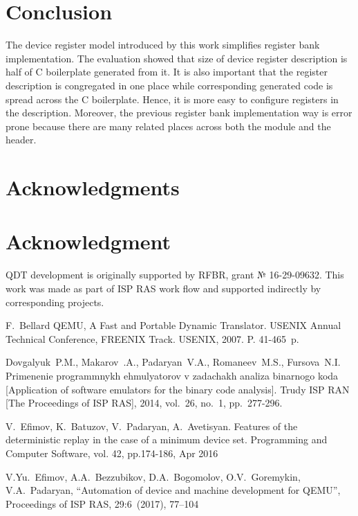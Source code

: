 \documentclass[conference,compsoc,a4paper]{IEEEtran}
\begin{document}
\section{Conclusion}

The device register model introduced by this work simplifies register
bank implementation.
The evaluation showed that size of device register description is half of
C boilerplate generated from it.
It is also important that the register description is congregated in one
place while corresponding generated code is spread across the C boilerplate.
Hence, it is more easy to configure registers in the description.
Moreover, the previous register bank implementation way is error prone
because there are many related places across both the module and the header.


\ifCLASSOPTIONcompsoc
  \section*{Acknowledgments}
\else
  \section*{Acknowledgment}
\fi

QDT development is originally supported by RFBR, grant № 16-29-09632.
This work was made as part of ISP RAS work flow and supported indirectly
by corresponding projects.

\begin{thebibliography}{1}

F.~Bellard QEMU, A Fast and Portable Dynamic Translator. USENIX Annual
Technical Conference, FREENIX Track. USENIX, 2007. P. 41-465~p.

Dovgalyuk~P.M., Makarov~.A., Padaryan~V.A., Romaneev~M.S.,
Fursova~N.I. Primenenie programmnykh ehmulyatorov v zadachakh
analiza binarnogo koda [Application of software emulators for
the binary code analysis]. Trudy ISP RAN [The Proceedings of
ISP RAS], 2014, vol.~26, no.~1, pp.~277-296.

V.~Efimov, K.~Batuzov, V.~Padaryan, A.~Avetisyan. Features of the deterministic
replay in the case of a minimum device set. Programming and Computer
Software, vol. 42, pp.174-186, Apr 2016

V.Yu.~Efimov, A.A.~Bezzubikov, D.A.~Bogomolov, O.V.~Goremykin,
V.A.~Padaryan, “Automation of device and machine development
for QEMU”, Proceedings of ISP RAS, 29:6~(2017), 77–104

\end{thebibliography}
\end{document}
